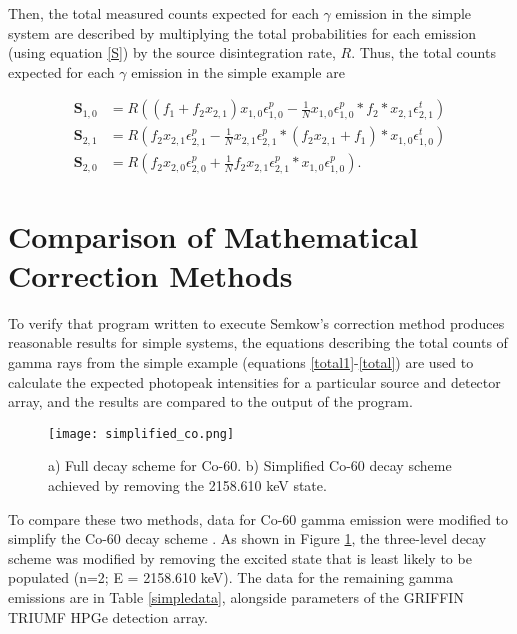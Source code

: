 \documentclass[12pt,twoside]{reedthesis}
\begin{document}
Then, the total measured counts expected for each $\gamma$ emission in the simple system are described by multiplying the total probabilities for each emission (using equation \ref{S}) by the source disintegration rate, $R$. Thus, the total counts expected for each $\gamma$ emission in the simple example are

\begin{align}
\textbf{S}_{1,0} &= R \left((f_{1} + f_{2} x_{2,1}) x_{1,0} \epsilon^{p}_{1,0} - \frac{1}{N} x_{1,0} \epsilon^{p}_{1,0} * f_{2} * x_{2,1} \epsilon^{t}_{2,1}\right) \\
\label{total1}
\textbf{S}_{2,1} &= R \left(f_{2} x_{2,1} \epsilon^{p}_{2,1} - \frac{1}{N} x_{2,1} \epsilon^{p}_{2,1} * (f_{2} x_{2,1} + f_{1}) * x_{1,0} \epsilon^{t}_{1,0}\right) \\
\textbf{S}_{2,0} &= R \left(f_{2} x_{2,0} \epsilon^{p}_{2,0} + \frac{1}{N} f_{2} x_{2,1} \epsilon^{p}_{2,1} * x_{1,0} \epsilon^{p}_{1,0}\right).
\label{total}
\end{align}


\section{Comparison of Mathematical Correction Methods}

To verify that program written to execute Semkow's correction method produces reasonable results for simple systems, the equations describing the total counts of gamma rays from the simple example (equations  \ref{total1}-\ref{total}) are used to calculate the expected photopeak intensities for a particular source and detector array, and the results are compared to the output of the program. 

 \begin{figure}[h!]
	\centering
	\texttt{[image: simplified\_co.png]}
	\caption{a) Full decay scheme for Co-60. b) Simplified Co-60 decay scheme achieved by removing the 2158.610 keV state.}
\label{simple_co}
\end{figure}

To compare these two methods, data for Co-60 gamma emission were modified to simplify the Co-60 decay scheme \cite{nuclide-co60}. As shown in Figure \ref{simple_co}, the three-level decay scheme was modified by removing the excited state that is least likely to be populated (n=2; E = 2158.610 keV). The data for the remaining gamma emissions are in Table \ref{simpledata}, alongside parameters of the GRIFFIN TRIUMF HPGe detection array.
\end{document}
